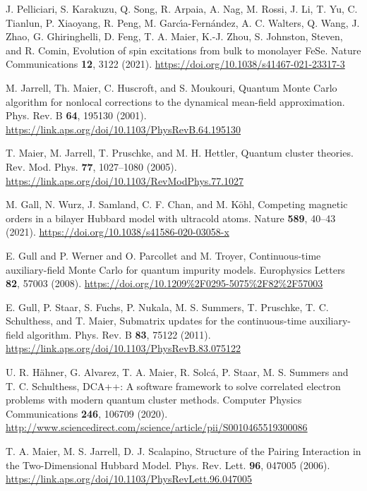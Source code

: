 \documentclass[prb,twocolumn,amsmath,amssymb,superscriptaddress,floatfix,nofootinbib]{revtex4-2}
\begin{document}
\begin{thebibliography}{}
J. Pelliciari, S. Karakuzu, Q. Song, R. Arpaia, A. Nag, M. Rossi, J. Li, T. Yu, C. Tianlun, P. Xiaoyang, R. Peng, M. Garc{\'\i}a-Fern{\'a}ndez, A. C. Walters, Q. Wang, J. Zhao, G. Ghiringhelli, D. Feng, T. A. Maier, K.-J. Zhou, S. Johnston, Steven, and R. Comin, {Evolution of spin excitations from bulk to monolayer {FeSe}}. {Nature Communications} {\bf 12}, 3122 (2021). \url{https://doi.org/10.1038/s41467-021-23317-3}

M. Jarrell, Th. Maier, C. Huscroft, and S. Moukouri, {Quantum {Monte Carlo} algorithm for nonlocal corrections to the dynamical mean-field approximation}. Phys. Rev. B {\bf 64}, {195130} (2001). 
\url{https://link.aps.org/doi/10.1103/PhysRevB.64.195130}

T. Maier, M. Jarrell, T. Pruschke, and M. H. Hettler, {Quantum cluster theories}. Rev. Mod. Phys. {\bf 77}, 1027--1080 (2005).  \url{https://link.aps.org/doi/10.1103/RevModPhys.77.1027}

M. Gall, N. Wurz, J. Samland, C. F. Chan, and M. K{\"o}hl, {Competing magnetic orders in a bilayer {Hubbard} model with ultracold atoms}. 
Nature {\bf 589}, 40--43 (2021). \url{https://doi.org/10.1038/s41586-020-03058-x} 

E. Gull and P. Werner and O. Parcollet and M. Troyer, {Continuous-time auxiliary-field {Monte Carlo} for quantum impurity models}. Europhysics Letters 
{\bf 82}, 57003 (2008). \url{https://doi.org/10.1209%2F0295-5075%2F82%2F57003}

E. Gull, P. Staar, S. Fuchs, P. Nukala, M. S. Summers, T. Pruschke, T. C. Schulthess, and T. Maier, {Submatrix updates for the continuous-time auxiliary-field algorithm}. Phys. Rev. B {\bf 83}, 75122 (2011). 
\url{https://link.aps.org/doi/10.1103/PhysRevB.83.075122}


U. R. H{\"a}hner, G. Alvarez, T. A. Maier, R. Solc{\'a}, P. Staar, M. S. Summers and T. C. Schulthess, {{DCA}++: A software framework to solve correlated electron problems with modern quantum cluster methods}. Computer Physics Communications {\bf 246}, 106709 (2020). \url{http://www.sciencedirect.com/science/article/pii/S0010465519300086}

T. A. Maier, M. S. Jarrell, D. J. Scalapino, {Structure of the Pairing Interaction in the Two-Dimensional {Hubbard} Model}. Phys. Rev. Lett. {\bf 96}, 047005 (2006). \url{https://link.aps.org/doi/10.1103/PhysRevLett.96.047005}


\end{thebibliography}
\end{document}
